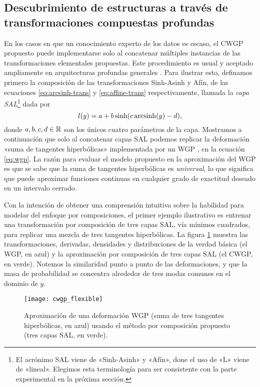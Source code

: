 \subsection{Descubrimiento de estructuras a través de transformaciones compuestas profundas}
\label{sec:experiments}

En los casos en que un conocimiento experto de los datos es escaso, el CWGP propuesto puede implementarse solo al concatenar múltiples instancias de las transformaciones elementales propuestas. Este procedimiento es usual y aceptado ampliamente en arquitecturas profundas generales \cite{bengio2009learning,Goodfellow-et-al-2016,DL_overview}. Para ilustrar esto, definamos primero la composición de las transformaciones Sinh-Asinh y Afín, de las ecuaciones \eqref{eq:arcsinh-trans} y \eqref{eq:affine-trans} respectivamente, llamada la \emph{capa SAL}\footnote{El acrónimo SAL viene de «Sinh-Asinh» y «Afín», done el uso de «L» viene de «lineal». Elegimos esta terminología para ser consistente con la parte experimental en la próxima sección.} dada por
\begin{equation}
	\label{eq:layer}
	l(y) = a + b \sinh(c \operatorname{arcsinh}(y) - d),
\end{equation}
donde \(a, b, c, d \in \mathbb{R}\) son los únicos cuatro parámetros de la capa. Mostramos a continuación que solo al concatenar capas SAL podemos replicar la deformación «suma de tangentes hiperbólicas» implementada por un WGP \cite{snelson2004warped}, en la ecuación \eqref{eq:wgp}. La razón para evaluar el modelo propuesto en la aproximación del WGP es que se sabe que la suma de tangentes hiperbólicas es \emph{universal}, lo que significa que puede aproximar funciones continuas en cualquier grado de exactitud deseado en un intervalo cerrado.

Con la intención de obtener una comprensión intuitiva sobre la habilidad para modelar del enfoque por composiciones, el primer ejemplo ilustrativo es entrenar una transformación por composición de tres capas SAL, vía mínimos cuadrados, para replicar una mezcla de tres tangentes hiperbólicas. La figura \ref{fig:cwgp_flexible} muestra las transformaciones, derivadas, densidades y distribuciones de la verdad básica (el WGP, en azul) y la aproximación por composición de tres capas SAL (el CWGP, en verde). Notemos la similaridad punto a punto de las deformaciones, y que la masa de probabilidad se concentra alrededor de tres modas comunes en el dominio de \(y\).

\begin{figure}[h]
	\centering
	\texttt{[image: cwgp\_flexible]}
	\caption{Aproximación de una deformación WGP (suma de tres tangentes hiperbólicas, en azul) usando el método por composición propuesto (tres capas SAL, en verde).}
	\label{fig:cwgp_flexible}
\end{figure}

